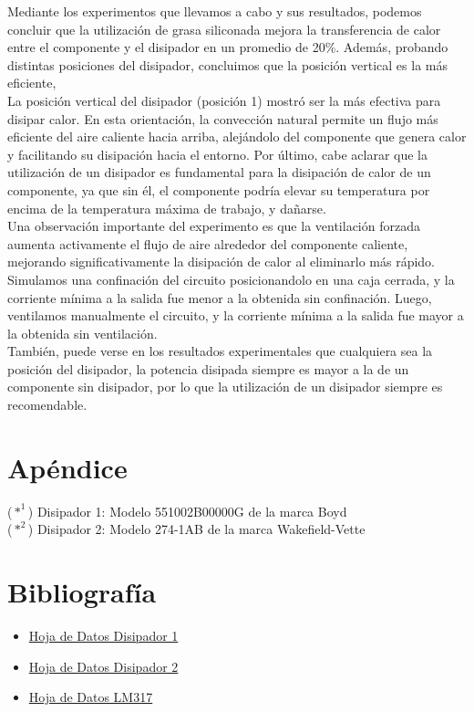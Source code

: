 \documentclass[conference]{IEEEtran}
\begin{document}
    Mediante los experimentos que llevamos a cabo y sus resultados, podemos concluir que la utilización de grasa 
    siliconada mejora la transferencia de calor entre el componente y el disipador en un promedio de 20\%. Además,
    probando distintas posiciones del disipador, concluimos que la posición vertical es la más eficiente,
    \\La posición vertical del disipador (posición 1) mostró ser la más efectiva para disipar calor. En esta orientación, 
    la convección natural permite un flujo más eficiente del aire caliente hacia arriba, alejándolo del componente que 
    genera calor y facilitando su disipación hacia el entorno. Por último, cabe aclarar que la utilización de un
    disipador es fundamental para la disipación de calor de un componente, ya que sin él, el componente podría elevar
    su temperatura por encima de la temperatura máxima de trabajo, y dañarse. \\Una observación importante del experimento
    es que la ventilación forzada aumenta activamente el flujo de aire alrededor del componente caliente, mejorando 
    significativamente la disipación de calor al eliminarlo más rápido. Simulamos una confinación del circuito posicionandolo
    en una caja cerrada, y la corriente mínima a la salida fue menor a la obtenida sin confinación. Luego, ventilamos
    manualmente el circuito, y la corriente mínima a la salida fue mayor a la obtenida sin ventilación.
    \\También, puede verse en los resultados
    experimentales que cualquiera sea la posición del disipador, la potencia disipada siempre es mayor a la de un
    componente sin disipador, por lo que la utilización de un disipador siempre es recomendable.

    \section{Apéndice}
    ($*^1$) Disipador 1: Modelo 551002B00000G de la marca Boyd \\
    ($*^2$) Disipador 2: Modelo 274-1AB de la marca Wakefield-Vette \\
    \section{Bibliografía}
    \begin{itemize}
        \item \href{https://www.digikey.com/en/products/detail/wakefield-vette/274-1AB/340321}{Hoja de Datos Disipador 1}
        \item \href{https://es.farnell.com/boyd/551002b00000g/heat-sink/dp/1339511}{Hoja de Datos Disipador 2}
        \item \href{https://www.alldatasheet.es/datasheet-pdf/pdf/22749/STMICROELECTRONICS/LM317.html}{Hoja de Datos LM317}
    \end{itemize}
\end{document}
